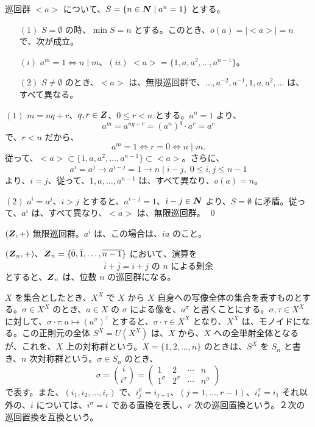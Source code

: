 \begin{prop} \label{prop:order_a}
巡回群 $<a>$ について、$S = \{n\in \mbox{\boldmath $N$}\mid a^n = 1\}$ とする。
\begin{itemize}
\item[$(1)$] $S =\emptyset$ の時、$\min S = n$  とする。このとき、$o(a) = |<a>| = n$ で、次が成立。

$(i)$ $a^m = 1 \Leftrightarrow n\mid m$、$(ii)$ $<a> = \{1, a, a^2, \ldots, a^{n-1}\}$。
\item[$(2)$] $S \neq \emptyset$ のとき、$<a>$ は、無限巡回群で、$\ldots, a^{-2}, a^{-1}, 1, a, a^2, \ldots $  は、すべて異なる。
\end{itemize}
\end{prop}
\proof
$(1)$ $m = nq + r$、$q, r\in \mbox{\boldmath $Z$}$、$0\leq r < n$ とする。$a^n = 1$ より、
$$a^m = a^{nq + r} = (a^n)^q\cdot a^r = a^r$$
で、$r<n$ だから、
$$a^m = 1 \Leftrightarrow r = 0 \Leftrightarrow n\mid m.$$
従って、$<a> \subset \{1,a, a^2, \ldots, a^{n-1}\} \subset <a>$。さらに、
$$a^i = a^j \to a^{i-j} = 1 \to n\mid i-j, \;0\leq i, j\leq n-1$$
より、$i = j$、従って、$1, a, \ldots, a^{n-1}$ は、すべて異なり、$o(a) = n$。

$(2)$ $a^i = a^j$、$i>j$  とすると、$a^{i-j} = 1$、$i-j\in \mbox{\boldmath $N$}$ より、$S = \emptyset$ に矛盾。従って、$a^i$ は、すべて異なり、$<a>$ は、無限巡回群。
\qed

\begin{eg}
$(\mbox{\boldmath $Z$},+)$ 無限巡回群。$a^i$ は、この場合は、$ia$ のこと。

$(\mbox{\boldmath $Z$}_n,+)$、$\mbox{\boldmath $Z$}_n = \{\bar{0}, \bar{1}, \ldots, \overline{n-1}\}$ において、演算を
$$\bar{i} + \bar{j} = \overline{i + j \mbox{ の $n$  による剰余}}$$
とすると、$\mbox{\boldmath $Z$}_n$ は、位数 $n$  の巡回群になる。
\end{eg}

\begin{eg}
$X$ を集合としたとき、$X^X$ で $X$ から $X$ 自身への写像全体の集合を表すものとする。$\sigma\in X^X$ のとき、$a\in X$ の $\sigma$ による像を、$a^{\sigma}$ と書くことにする。$\sigma, \tau\in X^X$ に対して、$\sigma\cdot\tau : a\mapsto (a^{\sigma})^{\tau}$ とすると、$\sigma\cdot\tau\in X^X$ となり、$X^X$ は、モノイドになる。この正則元の全体 $S^X = U(X^X)$ は、$X$ から、$X$ への全単射全体となるが、これを、$X$ 上の対称群という。$X = \{1, 2, \ldots, n\}$  のときは、$S^X$ を $S_n$ と書き、$n$ 次対称群という。$\sigma\in S_n$ のとき、
$$\sigma = {i\choose i^{\sigma}} = \left(\begin{array}{cccc}1 & 2 & \cdots & n\\ 1^{\sigma} & 2^{\sigma} & \cdots & n^{\sigma}\end{array}\right)$$
で表す。また、$(i_1, i_2, \ldots, i_r)$ で、$i^{\sigma}_j = i_{j+1}$、$(j = 1, \ldots, r-1)$、$i_r^{\sigma} = i_1$ それ以外の、$i$ については、$i^{\sigma} = i$ である置換を表し、$r$ 次の巡回置換という。２次の巡回置換を互換という。
\end{eg}

